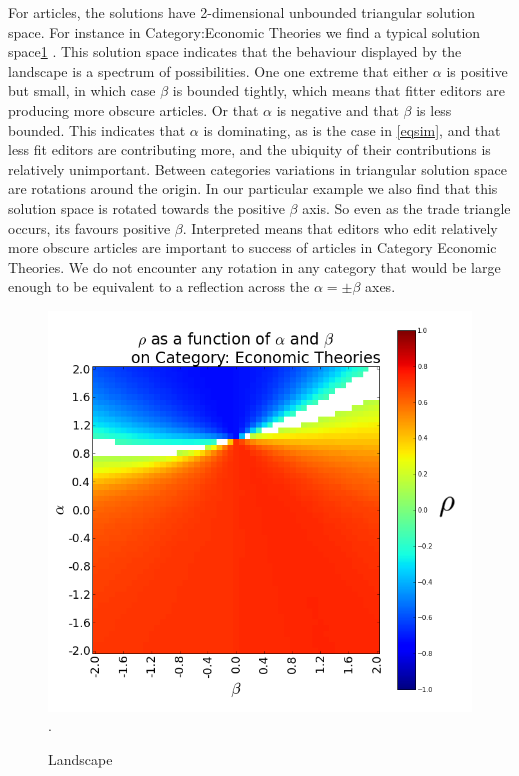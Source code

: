 For articles, the solutions have 2-dimensional unbounded triangular solution space. For instance in Category:Economic Theories we find a typical solution space\ref{fig:landscape} . This solution space indicates that the behaviour displayed by the  landscape is a spectrum of possibilities. One one extreme that either $\alpha$ is positive but small, in which case $\beta$ is bounded tightly, which means that fitter editors are producing more obscure articles. Or that $\alpha$ is negative and that $\beta$ is less bounded. This indicates that $\alpha$ is dominating, as is the case in \eqref{eqsim}, and that less fit editors are contributing more, and the ubiquity of their contributions is relatively unimportant. Between categories variations in triangular solution space are rotations around the origin. In our particular example we also find that this solution space is rotated towards the positive $\beta$ axis. So even as the trade triangle occurs, its favours positive $\beta$. Interpreted means that editors who edit relatively more obscure articles are important to success of articles in Category Economic Theories. We do not encounter any rotation in any category that would be large enough to be equivalent to a reflection across the $\alpha = \pm \beta$ axes.

\begin{figure}[!t]
\centering
\includegraphics[width=0.9\columnwidth]{Figures/landscape.png}.
\caption{Landscape}
\label{fig:landscape}
\end{figure}




